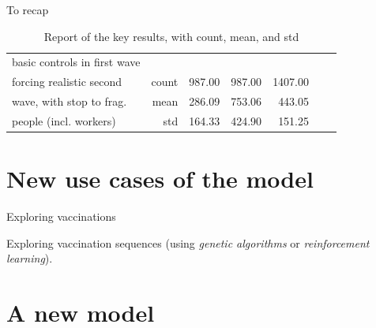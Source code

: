 \documentclass[8pt]{beamer}
\begin{document}
\begin{frame}{To recap}
\begin{table}[H]
\begin{tabular}{lrrrrrr}
\midrule
basic controls in first wave \\   
forcing realistic second       & count &   987.00 &                     987.00 & 1407.00 \\
wave, with stop to frag.      & mean  &   286.09 &                     753.06 &  443.05 \\
people (incl. workers)         & std   &   164.33 &                     424.90 &  151.25 \\

\bottomrule
\end{tabular}
\caption{Report of the key results, with count, mean, and std}
\label{keyResultsT}
\end{table}



\end{frame}

\section{New use cases of the model}

\begin{frame}{Exploring vaccinations}

Exploring vaccination sequences (using \emph{genetic algorithms} or \emph{reinforcement learning}).

\end{frame}


\section{A new model}
\end{document}
